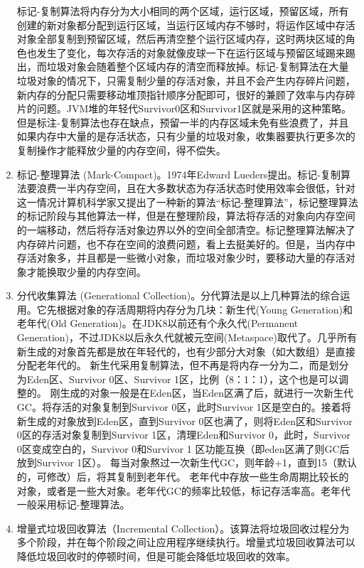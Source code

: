 \documentclass[../../../interview-questions.tex]{subfiles}
\begin{document}
\begin{enumerate}
    标记-复制算法将内存分为大小相同的两个区域，运行区域，预留区域，所有创建的新对象都分配到运行区域，当运行区域内存不够时，将运作区域中存活对象全部复制到预留区域，然后再清空整个运行区域内存，这时两块区域的角色也发生了变化，每次存活的对象就像皮球一下在运行区域与预留区域踢来踢出，而垃圾对象会随着整个区域内存的清空而释放掉。标记-复制算法在大量垃圾对象的情况下，只需复制少量的存活对象，并且不会产生内存碎片问题，新内存的分配只需要移动堆顶指针顺序分配即可，很好的兼顾了效率与内存碎片的问题。JVM堆的年轻代Survivor0区和Survivor1区就是采用的这种策略。但是标注-复制算法也存在缺点，预留一半的内存区域未免有些浪费了，并且如果内存中大量的是存活状态，只有少量的垃圾对象，收集器要执行更多次的复制操作才能释放少量的内存空间，得不偿失。
    \item{标记-整理算法 (Mark-Compact)。}1974年Edward Lueders提出。标记-复制算法要浪费一半内存空间，且在大多数状态为存活状态时使用效率会很低，针对这一情况计算机科学家又提出了一种新的算法“标记-整理算法”，标记整理算法的标记阶段与其他算法一样，但是在整理阶段，算法将存活的对象向内存空间的一端移动，然后将存活对象边界以外的空间全部清空。标记整理算法解决了内存碎片问题，也不存在空间的浪费问题，看上去挺美好的。但是，当内存中存活对象多，并且都是一些微小对象，而垃圾对象少时，要移动大量的存活对象才能换取少量的内存空间。
    \item{分代收集算法 (Generational Collection)。}分代算法是以上几种算法的综合运用。它先根据对象的存活周期将内存分为几块：新生代(Young Generation)和老年代(Old Generation)。在JDK8以前还有个永久代(Permanent Generation)，不过JDK8以后永久代就被元空间(Metaspace)取代了。几乎所有新生成的对象首先都是放在年轻代的，也有少部分大对象（如大数组）是直接分配老年代的。
    新生代采用复制算法，但不再是将内存一分为二，而是划分为Eden区、Survivor 0区、Survivor 1区，比例（8：1：1），这个也是可以调整的。
    刚生成的对象一般是在Eden区，当Eden区满了后，就进行一次新生代GC。将存活的对象复制到Survivor 0区，此时Survivor 1区是空白的。接着将新生成的对象放到Eden区，直到Survivor 0区也满了，则将Eden区和Survivor 0区的存活对象复制到Survivor 1区，清理Eden和Survivor 0，此时，Survivor 0区变成空白的，Survivor 0和Survivor 1 区功能互换（即eden区满了则GC后放到Survivor 1区）。
    每当对象熬过一次新生代GC，则年龄+1，直到15（默认的，可修改）后，将其复制到老年代。
    老年代中存放一些生命周期比较长的对象，或者是一些大对象。老年代GC的频率比较低，标记存活率高。老年代一般采用标记-整理算法。
    \item {增量式垃圾回收算法（Incremental Collection）。}该算法将垃圾回收过程分为多个阶段，并在每个阶段之间让应用程序继续执行。增量式垃圾回收算法可以降低垃圾回收时的停顿时间，但是可能会降低垃圾回收的效率。
\end{enumerate}
\end{document}
